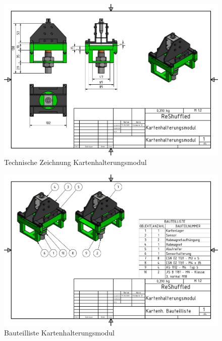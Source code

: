 \begin{figure}
    \centering
    \includegraphics[scale=0.85,page=1]{fig/mech/Kartenhalterungsmodul.pdf}
    \caption{Technische Zeichnung Kartenhalterungsmodul}
\end{figure}

\begin{figure}
    \centering
    \includegraphics[scale=0.85,page=1]{fig/mech/KartenhBauteilliste.pdf}
    \caption{Bauteilliste Kartenhalterungsmodul}
\end{figure}

